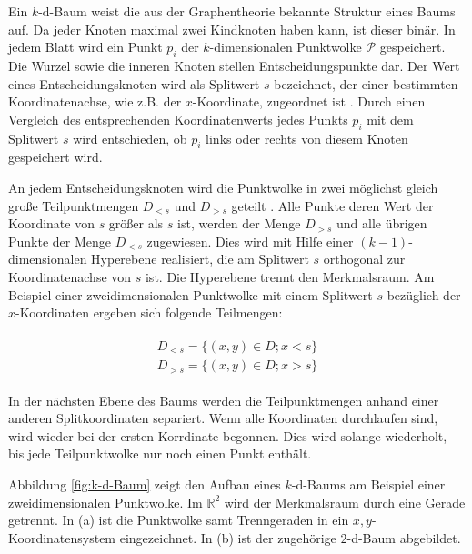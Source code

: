 Ein $k$-d-Baum weist die aus der Graphentheorie bekannte Struktur eines Baums auf. Da jeder Knoten maximal zwei Kindknoten haben kann, ist dieser binär. In jedem Blatt wird ein Punkt $ p_i$ der $k$-dimensionalen Punktwolke $ \mathcal{P} $ gespeichert. Die Wurzel sowie die inneren Knoten stellen Entscheidungspunkte dar. Der Wert eines Entscheidungsknoten wird als Splitwert $ s $ bezeichnet, der einer bestimmten Koordinatenachse, wie z.B. der $x$-Koordinate, zugeordnet ist \cite{Klein2005}. Durch einen Vergleich des entsprechenden Koordinatenwerts jedes Punkts $ p_i $ mit dem Splitwert $ s $ wird entschieden, ob $ p_i $ links oder rechts von diesem Knoten gespeichert wird.

An jedem Entscheidungsknoten wird die Punktwolke in zwei möglichst gleich große Teilpunktmengen $ D_{<s} $ und $ D_{>s} $ geteilt \cite{Klein2005}. Alle Punkte deren Wert der Koordinate von $ s $ größer als $ s $ ist, werden der Menge $ D_{>s} $ und alle übrigen  Punkte der Menge $ D_{<s} $ zugewiesen. Dies wird mit Hilfe einer $ (k-1) $-dimensionalen Hyperebene realisiert, die am Splitwert $ s $ orthogonal zur Koordinatenachse von $ s $ ist. Die Hyperebene trennt den Merkmalsraum. Am Beispiel einer zweidimensionalen Punktwolke mit einem Splitwert $ s $ bezüglich der $x$-Koordinaten ergeben sich folgende Teilmengen: 

\begin{align}
\begin{split}
	D_{<s} = \{(x,y) \in D;x<s\} \\
	D_{>s} = \{(x,y) \in D;x>s\}
\end{split}
\end{align} 

In der nächsten Ebene des Baums werden die Teilpunktmengen anhand einer anderen Splitkoordinaten separiert. Wenn alle Koordinaten durchlaufen sind, wird wieder bei der ersten Korrdinate begonnen. Dies wird solange wiederholt, bis jede Teilpunktwolke nur noch einen Punkt enthält. 

Abbildung \ref{fig:k-d-Baum} zeigt den Aufbau eines $k$-d-Baums am Beispiel einer zweidimensionalen Punktwolke. Im $ \mathbb{R}^2 $ wird der Merkmalsraum durch eine Gerade getrennt. In (a) ist die Punktwolke  samt Trenngeraden in ein $x,y$-Koordinatensystem eingezeichnet. In (b) ist der zugehörige $2$-d-Baum abgebildet. 


